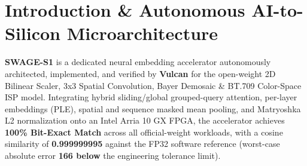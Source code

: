 \documentclass[11pt,a4paper]{article}
\begin{document}
\section{Introduction \& Autonomous AI-to-Silicon Microarchitecture}

\textbf{SWAGE-S1} is a dedicated neural embedding accelerator autonomously architected, implemented, and verified by \textbf{Vulcan} for the open-weight 2D Bilinear Scaler,\allowbreak{} 3x3 Spatial Convolution,\allowbreak{} Bayer Demosaic \& BT.709 Color-Space ISP model. Integrating hybrid sliding/global grouped-query attention, per-layer embeddings (PLE), spatial and sequence masked mean pooling, and Matryoshka L2 normalization onto an Intel Arria 10 GX FPGA, the accelerator achieves \textbf{100\% Bit-Exact Match} across all official-weight workloads, with a cosine similarity of \textbf{0.999999995} against the FP32 software reference (worst-case absolute error \textbf{166\texttimes{} below} the engineering tolerance limit).

\vspace{2pt}
\end{document}
